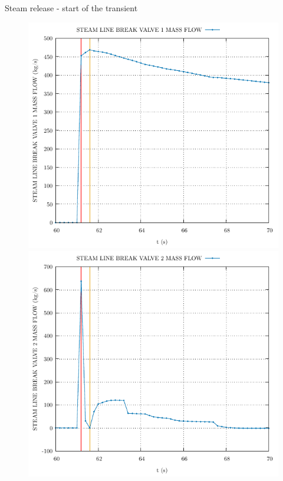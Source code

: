 \begin{frame}{Steam release - start of the transient}
	\begin{figure}
		\centering
		\begin{minipage}{.5\textwidth}
			\centering
			\includegraphics[width=\linewidth]{./graphs/STEAM LINE BREAK VALVE 1 MASS FLOW_start.pdf}
		\end{minipage}%
		\begin{minipage}{.5\textwidth}
			\centering
			\includegraphics[width=\linewidth]{./graphs/STEAM LINE BREAK VALVE 2 MASS FLOW_start.pdf}
		\end{minipage}
	\end{figure}


\end{frame}
